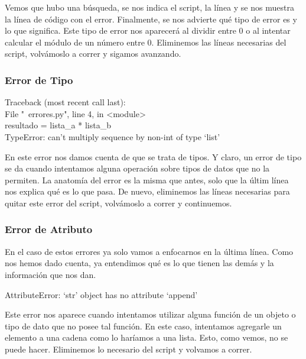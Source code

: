 \documentclass[10pt,letterpaper]{article}
\newenvironment{Code}
{
\begin{lrbox}{\selvestebox}%
\begin{minipage}{\dimexpr\columnwidth-2\fboxsep\relax}
\fontfamily{\ttdefault}\selectfont
}
{\end{minipage}\end{lrbox}%
\begin{center}
\colorbox{light-gray}{\usebox{\selvestebox}}
\end{center}
}
\begin{document}
Vemos que hubo una b\'usqueda, se nos indica el script, la l\'inea y se nos muestra la l\'inea de c\'odigo con el error. Finalmente, se nos advierte qu\'e tipo de error es y lo que significa. Este tipo de error nos aparecer\'a al dividir entre 0 o al intentar calcular el m\'odulo de un n\'umero entre 0. Eliminemos las l\'ineas necesarias del script, volv\'amoslo a correr y sigamos avanzando.

\subsubsection{Error de Tipo}

\begin{Code}
{\color{red}Traceback (most recent call last):\\
\hspace*{4mm} File "\ \hspace{-2mm}errores.py", line 4, in <module>\\
\hspace*{8mm} resultado = lista\_a * lista\_b\\
TypeError: can't multiply sequence by non-int of type `list'}
\end{Code}

En este error nos damos cuenta de que se trata de tipos. Y claro, un error de tipo se da cuando intentamos alguna operaci\'on sobre tipos de datos que no la permiten. La anatom\'ia del error es la misma que antes, solo que la \'ultim l\'inea nos explica qu\'e es lo que pasa. De nuevo, eliminemos las l\'ineas necesarias para quitar este error del script, volv\'amoslo a correr y continuemos.

\subsubsection{Error de Atributo}
En el caso de estos errores ya solo vamos a enfocarnos en la \'ultima l\'inea. Como nos hemos dado cuenta, ya entendimos qu\'e es lo que tienen las dem\'as y la informaci\'on que nos dan.

\begin{Code}
{\color{red} AttributeError: `str' object has no attribute `append'}
\end{Code}

Este error nos aparece cuando intentamos utilizar alguna funci\'on de un objeto o tipo de dato que no posee tal funci\'on. En este caso, intentamos agregarle un elemento a una cadena como lo har\'iamos a una lista. Esto, como vemos, no se puede hacer. Eliminemos lo necesario del script y volvamos a correr.
\end{document}
